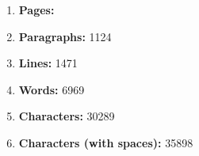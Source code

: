 \begin{enumerate}[itemsep = 0.1 pt]

      \item{
            \textbf{Pages:} 
            }

      \item{
            \textbf{Paragraphs:} 1124
            }


      \item{
            \textbf{Lines:} 1471
            }

      \item{
            \textbf{Words:} 6969
            }

      \item{
            \textbf{Characters:} 30289
            }
      \item{
            \textbf{Characters (with spaces):} 35898
            }

\end{enumerate}